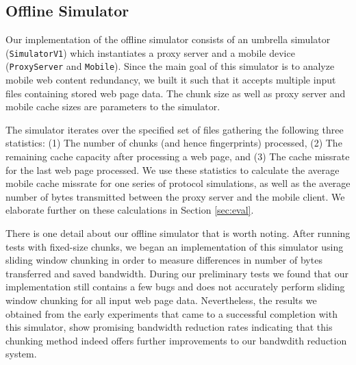 \subsection{Offline Simulator}
\label{sec:offline_sim}
Our implementation of the offline simulator consists of an umbrella simulator (\texttt{SimulatorV1}) which instantiates a proxy server and a mobile device (\texttt{ProxyServer} and \texttt{Mobile}). Since the main goal of this simulator is to analyze mobile web content redundancy, we built it such that it accepts multiple input files containing stored web page data. The chunk size as well as proxy server and mobile cache sizes are parameters to the simulator.

The simulator iterates over the specified set of files gathering the following three statistics: (1) The number of chunks (and hence fingerprints) processed, (2) The remaining cache capacity after processing a web page, and (3) The cache missrate for the last web page processed. We use these statistics to calculate the average mobile cache missrate for one series of protocol simulations, as well as the average number of bytes transmitted between the proxy server and the mobile client. We elaborate further on these calculations in Section \ref{sec:eval}.

There is one detail about our offline simulator that is worth noting. After running tests with fixed-size chunks, we began an implementation of this simulator using sliding window chunking in order to measure differences in number of bytes transferred and saved bandwidth. During our preliminary tests we found that our implementation still contains a few bugs and does not accurately perform sliding window chunking for all input web page data. Nevertheless, the results we obtained from the early experiments that came to a successful completion with this simulator, show promising bandwidth reduction rates indicating that this chunking method indeed offers further improvements to our bandwdith reduction system.
